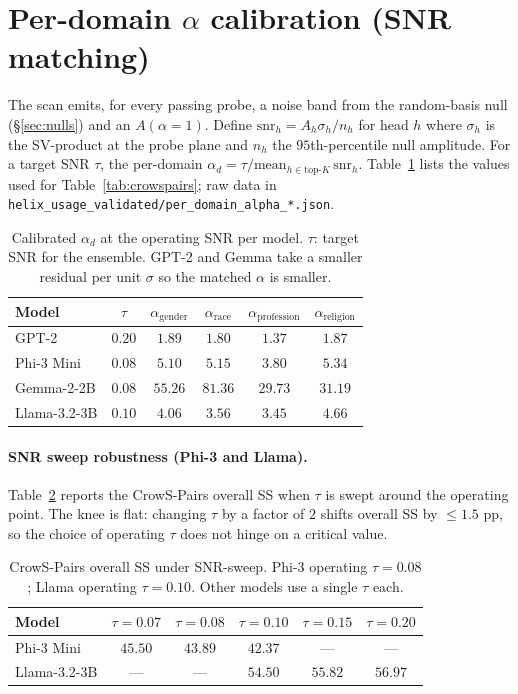 \section{Per-domain $\alpha$ calibration (SNR matching)}
\label{app:alpha_calib}

The scan emits, for every passing probe, a noise band from the
random-basis null (\S\ref{sec:nulls}) and an $A(\alpha{=}1)$.
Define $\mathrm{snr}_h = A_h \sigma_h / n_h$ for head $h$ where
$\sigma_h$ is the SV-product at the probe plane and $n_h$ the
$95$th-percentile null amplitude. For a target SNR $\tau$, the
per-domain $\alpha_d = \tau / \mathrm{mean}_{h \in \text{top-}K}\,
\mathrm{snr}_h$. Table~\ref{tab:alpha_calib} lists the values used for
Table~\ref{tab:crowspairs}; raw data in
\texttt{helix\_usage\_validated/per\_domain\_alpha\_*.json}.

\begin{table}[h]
\centering
\small
\caption{Calibrated $\alpha_d$ at the operating SNR per model.
$\tau$: target SNR for the ensemble. GPT-2 and Gemma take a smaller
residual per unit $\sigma$ so the matched $\alpha$ is smaller.}
\label{tab:alpha_calib}
\begin{tabular}{lccccc}
\toprule
Model & $\tau$ & $\alpha_{\text{gender}}$ & $\alpha_{\text{race}}$ &
$\alpha_{\text{profession}}$ & $\alpha_{\text{religion}}$ \\
\midrule
GPT-2        & $0.20$  & $1.89$  & $1.80$  & $1.37$  & $1.87$  \\
Phi-3 Mini   & $0.08$  & $5.10$  & $5.15$  & $3.80$  & $5.34$  \\
Gemma-2-2B   & $0.08$  & $55.26$ & $81.36$ & $29.73$ & $31.19$ \\
Llama-3.2-3B & $0.10$  & $4.06$  & $3.56$  & $3.45$  & $4.66$  \\
\bottomrule
\end{tabular}
\end{table}

\paragraph{SNR sweep robustness (Phi-3 and Llama).}
Table~\ref{tab:snr_sweep} reports the CrowS-Pairs overall SS when
$\tau$ is swept around the operating point. The knee is flat: changing
$\tau$ by a factor of $2$ shifts overall SS by $\leq 1.5$ pp, so the
choice of operating $\tau$ does not hinge on a critical value.

\begin{table}[h]
\centering
\small
\caption{CrowS-Pairs overall SS under SNR-sweep. Phi-3 operating
$\tau{=}0.08$; Llama operating $\tau{=}0.10$. Other models use a single
$\tau$ each.}
\label{tab:snr_sweep}
\begin{tabular}{lccccc}
\toprule
Model & $\tau{=}0.07$ & $\tau{=}0.08$ & $\tau{=}0.10$ & $\tau{=}0.15$ & $\tau{=}0.20$ \\
\midrule
Phi-3 Mini   & $45.50$ & $\mathbf{43.89}$ & $42.37$ & --- & --- \\
Llama-3.2-3B & ---     & ---              & $\mathbf{54.50}$ & $55.82$ & $56.97$ \\
\bottomrule
\end{tabular}
\end{table}


